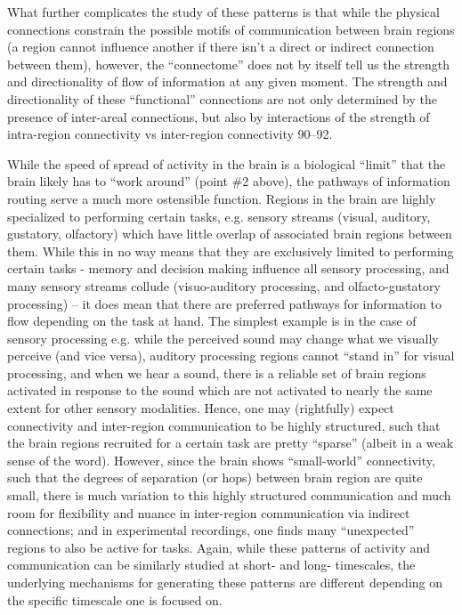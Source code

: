 \begin{refsection}
What further complicates the study of these patterns is that while the physical connections constrain the possible motifs of communication between brain regions (a region cannot influence another if there isn’t a direct or indirect connection between them), however, the “connectome” does not by itself tell us the strength and directionality of flow of information at any given moment. The strength and directionality of these “functional” connections are not only determined by the presence of inter-areal connections, but also by interactions of the strength of intra-region connectivity vs inter-region connectivity 90–92.

While the speed of spread of activity in the brain is a biological “limit” that the brain likely has to “work around” (point \#2 above), the pathways of information routing serve a much more ostensible function. Regions in the brain are highly specialized to performing certain tasks, e.g. sensory streams (visual, auditory, gustatory, olfactory) which have little overlap of associated brain regions between them. While this in no way means that they are exclusively limited to performing certain tasks - memory and decision making influence all sensory processing, and many sensory streams collude (visuo-auditory processing, and olfacto-gustatory processing) – it does mean that there are preferred pathways for information to flow depending on the task at hand. The simplest example is in the case of sensory processing e.g. while the perceived sound may change what we visually perceive (and vice versa), auditory processing regions cannot “stand in” for visual processing, and when we hear a sound, there is a reliable set of brain regions activated in response to the sound which are not activated to nearly the same extent for other sensory modalities. Hence, one may (rightfully) expect connectivity and inter-region communication to be highly structured, such that the brain regions recruited for a certain task are pretty “sparse” (albeit in a weak sense of the word). However, since the brain shows “small-world” connectivity, such that the degrees of separation (or hops) between brain region are quite small, there is much variation to this highly structured communication and much room for flexibility and nuance in inter-region communication via indirect connections; and in experimental recordings, one finds many “unexpected” regions to also be active for tasks. Again, while these patterns of activity and communication can be similarly studied at short- and long- timescales, the underlying mechanisms for generating these patterns are different depending on the specific timescale one is focused on.

\end{refsection}
